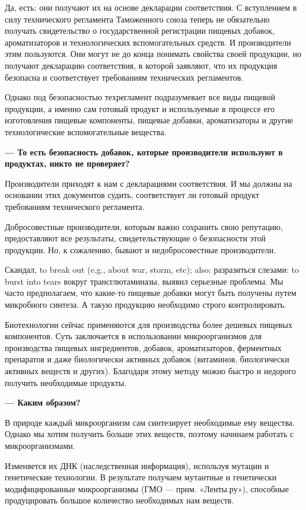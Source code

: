 Да, есть: они получают их на основе декларации соответствия.
С вступлением в силу технического регламента Таможенного союза теперь
не обязательно получать свидетельство о государственной регистрации
пищевых добавок, ароматизаторов и технологических вспомогательных средств.
И производители этим пользуются.
Они могут не до конца понимать свойства своей продукции,
но получают декларацию соответствия, в которой заявляют,
что их продукция безопасна и соответствует требованиям технических регламентов.

Однако под безопасностью техрегламент подразумевает все виды пищевой
продукции, а именно сам готовый продукт и используемые в процессе его
изготовления пищевые компоненты, пищевые добавки, ароматизаторы и другие
технологические вспомогательные вещества.


\textbf{--- То есть безопасность добавок, которые производители
    используют в продуктах, никто не проверяет?}

Производители приходят к нам с декларациями соответствия.
И мы должны на основании этих документов судить,
соответствует ли готовый продукт требованиям технического регламента.

Добросовестные производители, которым важно сохранить свою репутацию,
предоставляют все результаты, свидетельствующие о безопасности этой
продукции. Но, к сожалению, бывают и недобросовестные производители.

Скандал,
%
{to break out (e.g., about war, storm, etc); also:
    разразиться слезами: to burst into tears}
вокруг трансглютаминазы, выявил серьезные проблемы.
Мы часто предполагаем, что какие-то пищевые добавки могут
быть получены путем микробного синтеза.
А такую продукцию необходимо строго контролировать.

Биотехнологии сейчас применяются для производства более дешевых
пищевых компонентов. Суть заключается в использовании микроорганизмов
для производства пищевых ингредиентов, добавок, ароматизаторов,
ферментных препаратов и даже биологически активных добавок
(витаминов, биологически активных веществ и других).
Благодаря этому методу можно быстро и недорого получить необходимые продукты.

\textbf{--- Каким образом?}

В природе каждый микроорганизм сам синтезирует необходимые ему вещества.
Однако мы хотим получить больше этих веществ,
поэтому начинаем работать с микроорганизмами.

Изменяется их ДНК (наследственная информация), используя мутации
и генетические технологии.
В результате получаем мутантные и генетически модифицированные микроорганизмы
(ГМО --- прим. «Ленты.ру»), способные продуцировать
большое количество необходимых нам веществ.

